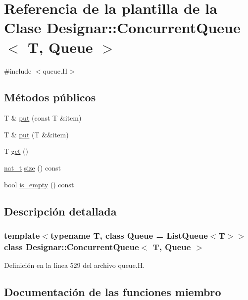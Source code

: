 \hypertarget{class_designar_1_1_concurrent_queue}{}\section{Referencia de la plantilla de la Clase Designar\+:\+:Concurrent\+Queue$<$ T, Queue $>$}
\label{class_designar_1_1_concurrent_queue}


{\ttfamily \#include $<$queue.\+H$>$}

\subsection*{Métodos públicos}
\begin{DoxyCompactItemize}
\item 
T \& \hyperlink{class_designar_1_1_concurrent_queue_a0ed3cfb2755c04be0f55f485b71637b9}{put} (const T \&item)
\item 
T \& \hyperlink{class_designar_1_1_concurrent_queue_aacc6c771061780c42058303f300b5acb}{put} (T \&\&item)
\item 
T \hyperlink{class_designar_1_1_concurrent_queue_aa4d86422e2ed7f70e2ad87e66f1864d5}{get} ()
\item 
\hyperlink{namespace_designar_aa72662848b9f4815e7bf31a7cf3e33d1}{nat\+\_\+t} \hyperlink{class_designar_1_1_concurrent_queue_acbeaea381f53471ea17366ab7a5fc52d}{size} () const
\item 
bool \hyperlink{class_designar_1_1_concurrent_queue_a7e73feaae8bc8aae37145a2484f28ea2}{is\+\_\+empty} () const
\end{DoxyCompactItemize}


\subsection{Descripción detallada}
\subsubsection*{template$<$typename T, class Queue = List\+Queue$<$\+T$>$$>$\newline
class Designar\+::\+Concurrent\+Queue$<$ T, Queue $>$}



Definición en la línea 529 del archivo queue.\+H.



\subsection{Documentación de las funciones miembro}
\mbox{\label{class_designar_1_1_concurrent_queue_aa4d86422e2ed7f70e2ad87e66f1864d5}} 
